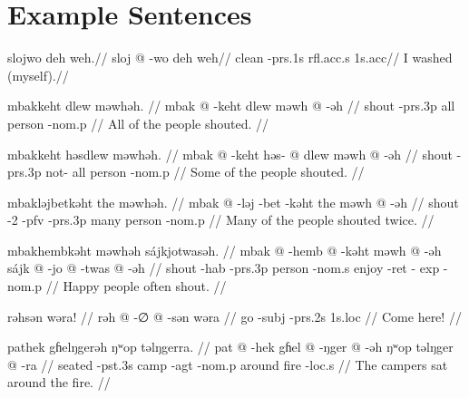 \section{Example Sentences}

\ex
\begingl
\glpreamble slojwo deh weh.//
\gla sloj @ -wo deh weh//
\glb clean -{\sc prs}.1s {\sc rfl}.{\sc acc}.s 1s.{\sc acc}//
\glft I washed (myself).//
\endgl
\xe

\pex
\a
\begingl
\glpreamble mbakkeht dlew məwhəh. //
\gla mbak @ -keht dlew məwh @ -əh //
\glb shout -{\sc prs}.3p all person -{\sc nom}.p //
\glft All of the people shouted. //
\endgl

\a
\begingl
\glpreamble mbakkeht həsdlew məwhəh. //
\gla mbak @ -keht həs- @ dlew məwh @ -əh //
\glb shout -{\sc prs}.3p not- all person -{\sc nom}.p //
\glft Some of the people shouted. //
\endgl

\a
\begingl
\glpreamble mbakləjbetkəht the məwhəh. //
\gla mbak @ -ləj -bet -kəht the məwh @ -əh //
\glb shout -2 -{\sc pfv} -{\sc prs}.3p many person -{\sc nom}.p //
\glft Many of the people shouted twice. //
\endgl

\a
\begingl
\glpreamble mbakhembkəht məwhəh sájkjotwasəh. //
\gla mbak @ -hemb @ -kəht məwh @ -əh sájk @ -jo @ -twas @ -əh //
\glb shout -{\sc hab} -{\sc prs}.3p person -{\sc nom}.s enjoy -{\sc ret} -{\sc
exp} -{\sc nom}.p //
\glft Happy people often shout. //
\endgl
\xe

\ex
\begingl
\glpreamble rəhsən wəra! //
\gla rəh @ -∅ @ -sən wəra //
\glb go -{\sc subj} -{\sc prs}.2s 1s.{\sc loc} //
\glft Come here! //
\endgl
\xe

\ex
\begingl
\glpreamble pathek gɦelŋgerəh ŋʷop təlŋgerra. //
\gla pat @ -hek gɦel @ -ŋger @ -əh ŋʷop təlŋger @ -ra //
\glb seated -{\sc pst}.3s camp -{\sc agt} -{\sc nom}.p around fire -{\sc loc}.s
//
\glft The campers sat around the fire. //
\endgl
\xe
